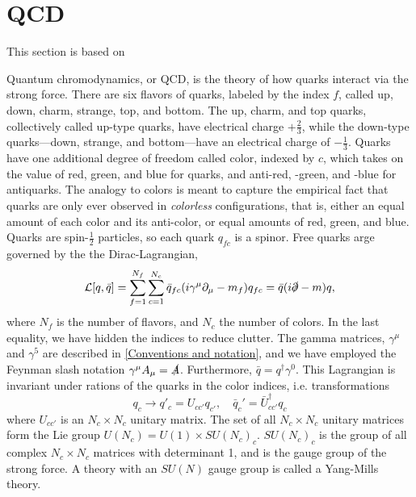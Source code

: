\section{QCD}
\label{section:QCD}
This section is based on~\cite{Schwartz:QFT,Peskin:IntroQFT,Scherer2002IntroductionTC}

Quantum chromodynamics, or QCD, is the theory of how quarks interact via the strong force.
There are six flavors of quarks, labeled by the index $f$, called up, down, charm, strange, top, and bottom.
The up, charm, and top quarks, collectively called up-type quarks, have electrical charge $+\frac{2}{3}$, while the down-type quarks---down, strange, and bottom---have an electrical charge of $-\frac{1}{3}$.
Quarks have one additional degree of freedom called color, indexed by $c$, which takes on the value of red, green, and blue for quarks, and anti-red, -green, and -blue for antiquarks.
The analogy to colors is meant to capture the empirical fact that quarks are only ever observed in \emph{colorless} configurations, that is, either an equal amount of each color and its anti-color, or equal amounts of red, green, and blue.
Quarks are spin-$\frac{1}{2}$ particles, so each quark $q_{fc}$ is a spinor.
Free quarks arge governed by the the Dirac-Lagrangian,
\begin{equation}
    \mathcal{L}[q, \bar q] = \sum_{f=1}^{N_f} \sum_{c = 1}^{N_c} \bar q_{fc} (i\gamma^\mu \partial_\mu - m_f )q_{fc}
    = \bar q (i\slashed{\partial } - m)q,
\end{equation}
where $N_f$ is the number of flavors, and $N_c$ the number of colors.
In the last equality, we have hidden the indices to reduce clutter.
The gamma matrices, $\gamma^\mu$ and $\gamma^5$ are described in \autoref{Conventions and notation}, and we have employed the Feynman slash notation $\gamma^\mu A_\mu = \slashed A$.
Furthermore, $\bar q = q^\dagger \gamma^0$.
This Lagrangian is invariant under rations of the quarks in the color indices, i.e. transformations
\begin{equation}
    q_c \rightarrow q'_c = U_{cc'} q_{c'},
    \quad 
    \bar q_c' = \bar U_{cc'}^\dagger q_c
\end{equation}
where $U_{cc'}$ is an $N_c \times N_c$ unitary matrix.
The set of all $N_c\times N_c$ unitary matrices form the Lie group $U(N_c) = U(1)\times SU(N_c)_c$.
$SU(N_c)_c$ is the group of all complex $N_c\times N_c$ matrices with determinant 1, and is the gauge group of the strong force.
A theory with an $SU(N)$ gauge group is called a Yang-Mills theory.


